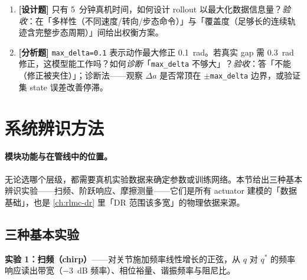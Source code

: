
\begin{practice}[本节练习]
\begin{enumerate}
  \item \textbf{[设计题]} 只有 5~分钟真机时间，如何设计 rollout 以最大化数据信息量？\emph{验收}：在「多样性（不同速度/转向/步态命令）」与「覆盖度（足够长的连续轨迹含完整步态周期）」间给出权衡方案。
  \item \textbf{[分析题]} \verb|max_delta=0.1| 表示动作最大修正 0.1~rad。若真实 gap 需 0.3~rad 修正，这模型能工作吗？如何\emph{诊断}「\verb|max_delta| 不够大」？\emph{验收}：答「不能（修正被夹住）」；诊断法——观察 $\Delta a$ 是否常顶在 $\pm$\verb|max_delta| 边界，或验证集 state 误差改善停滞。
\end{enumerate}
\end{practice}

\section{系统辨识方法}
\label{sec:rlmc-act-sysid}

\paragraph{模块功能与在管线中的位置。}无论选哪个层级，都需要真机实验数据来确定参数或训练网络。本节给出三种基本辨识实验——扫频、阶跃响应、摩擦测量——它们是所有 actuator 建模的「数据基础」，也是 \cref{ch:rlmc-dr} 里「DR 范围该多宽」的物理依据来源。

\subsection{三种基本实验}
\label{sec:rlmc-act-sysid-three}

\textbf{实验 1：扫频（chirp）}——对关节施加频率线性增长的正弦，从 $q$ 对 $q^*$ 的频率响应读出带宽（$-3$~dB 频率）、相位裕量、谐振频率与阻尼比。

